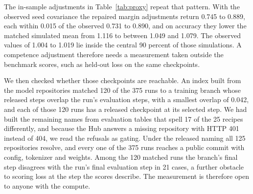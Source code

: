 The in-sample adjustments in Table~\ref{tab:proxy} repeat that pattern. With the observed seed covariance the repaired margin adjustments return 0.745 to 0.889, each within 0.015 of the observed 0.731 to 0.890, and on accuracy they lower the matched simulated mean from 1.116 to between 1.049 and 1.079. The observed values of 1.004 to 1.019 lie inside the central 90 percent of those simulations. A competence adjustment therefore needs a measurement taken outside the benchmark scores, such as held-out loss on the same checkpoints.

We then checked whether those checkpoints are reachable. An index built from the model repositories matched 120 of the 375 runs to a training branch whose released steps overlap the run's evaluation steps, with a smallest overlap of 0.042, and each of those 120 runs has a released checkpoint at its selected step. We had built the remaining names from evaluation tables that spell 17 of the 25 recipes differently, and because the Hub answers a missing repository with HTTP 401 instead of 404, we read the refusals as gating. Under the released naming all 125 repositories resolve, and every one of the 375 runs reaches a public commit with config, tokenizer and weights. Among the 120 matched runs the branch's final step disagrees with the run's final evaluation step in 21 cases, a further obstacle to scoring loss at the step the scores describe. The measurement is therefore open to anyone with the compute.

